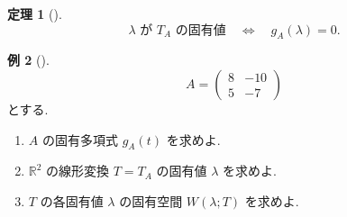 \documentclass[dvipdfmx,a4paper,11pt]{article} %
\theoremstyle{definition}
\newtheorem{thm}{定理}[section]
\newtheorem{eg}[thm]{例}
\begin{document}
\begin{thm}
[{\cite[定理5.3.1]{M}}]
\[
\lambda\text{ が }T_A\text{ の固有値}
\quad\Longleftrightarrow\quad
g_A(\lambda)=0.
\]
\end{thm}

\begin{eg}
[{\cite[例題5.3.1]{M}}]
\[
A=
\begin{pmatrix}
8&-10\\
5&-7
\end{pmatrix}
\]
とする.
\begin{enumerate}
\item[(1)] $A$ の固有多項式 $g_A(t)$ を求めよ.
\item[(2)] $\mathbb{R}^2$ の線形変換 $T=T_A$ の固有値 $\lambda$ を求めよ.
\item[(3)] $T$ の各固有値 $\lambda$ の固有空間 $W(\lambda;T)$ を求めよ.
\end{enumerate}
\end{eg}
\end{document}

